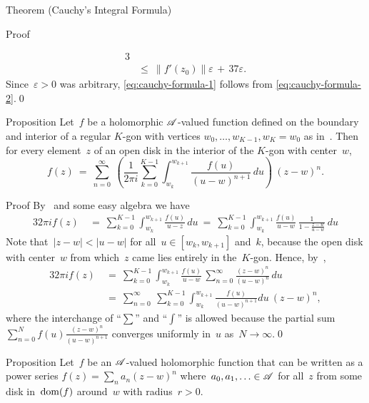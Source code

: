 \documentclass[a]{subfiles}
\begin{document}
\begin{parsec}
\begin{point}{Theorem (Cauchy's Integral Formula)}
\begin{point}{Proof}
\begin{point}
\begin{alignat*}{3}
\\
	\ &\leq \ \|f'(z_0)\|\varepsilon\,+\,37\varepsilon.
\end{alignat*}
Since~$\varepsilon>0$ was arbitrary,
 \eqref{eq:cauchy-formula-1}
follows from \eqref{eq:cauchy-formula-2}.\qed
\end{point}
\end{point}
\end{point}
\begin{point}[taylor]{Proposition}%
Let~$f$ be a holomorphic $\mathscr{A}$-valued function
defined on the boundary and interior
of a regular $K$-gon
with vertices $w_0,\dotsc,w_{K-1},w_K=w_0$
as in~.
Then for every element~$z$ of an open disk in the interior of the $K$-gon
with center~$w$,
\begin{equation*}
f(z)\ = \ 
	\sum_{n=0}^\infty \ 
	\left(\frac{1}{2\pi i}\sum_{k=0}^{K-1}\int_{w_k}^{w_{k+1}} 
	\frac{f(u)}{(u-w)^{n+1}}\,du\right)
\ (z-w)^n.
\end{equation*} 
\begin{point}{Proof}%
By~ and some easy algebra we have
\begin{alignat*}{3}
2\pi if(z)\ &=\  
	\sum_{k=0}^{K-1}\int_{w_k}^{w_{k+1}}
	\frac{f(u)}{u-z}\,du
\ =\ 
\sum_{k=0}^{K-1}\int_{w_k}^{w_{k+1}}
   \frac{f(u)}{u-w}\,\frac{1}{1-\frac{z-w}{u-w}}\,du
\end{alignat*}
Note that~$\left|z-w\right|<\left|u-w\right|$
for all~$u\in [w_k,w_{k+1}]$ and~$k$,
because the open disk with center~$w$
from which~$z$ came lies entirely in the~$K$-gon.
Hence,
by~\sref{geometric},
\begin{alignat*}{3}
	2\pi if(z) \ &= \ 
\sum_{k=0}^{K-1}\int_{w_k}^{w_{k+1}}
   \frac{f(u)}{u-w}\, \sum_{n=0}^\infty 
\frac{(z-w)^n}{(u-w)^n}
 \,du\\
 \ &= \ 
  \sum_{n=0}^\infty \ 
\sum_{k=0}^{K-1}\int_{w_k}^{w_{k+1}}
  \frac{f(u)}{(u-w)^{n+1}}du \ (z-w)^n,
\end{alignat*}
where the interchange of ``$\sum$'' and ``$\int$''
is allowed
because the partial sum 
$\sum_{n=0}^Nf(u)\frac{(z-w)^n}{(u-w)^{n+1}}$
converges uniformly in~$u$ as~$N\to\infty$.\qed
\end{point}
\end{point}
\begin{point}[rigid-expansion]{Proposition}%
Let~$f$ be an $\mathscr{A}$-valued holomorphic
function
that 
can be written as a power
series $f(z)=\sum_n a_n (z-w)^n$
where~$a_0,a_1,\dotsc\in\mathscr{A}$
for all~$z$ from some disk in~$\operatorname{dom}(f)$ around~$w$
with radius~$r>0$.


\end{point}
\end{parsec}
\end{document}
